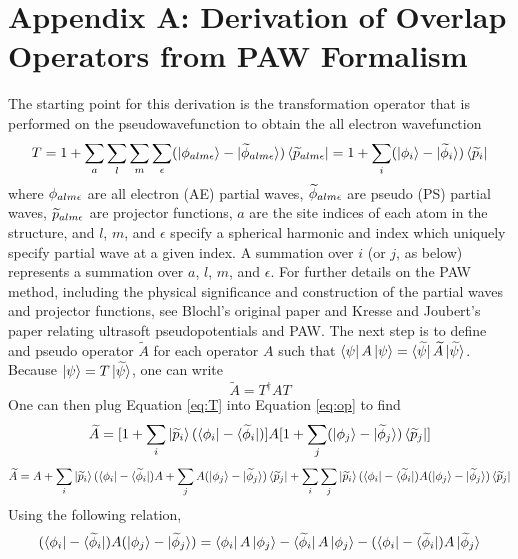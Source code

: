 \documentclass[12pt]{article}
\begin{document}
\section*{Appendix A: Derivation of Overlap Operators from PAW Formalism}
The starting point for this derivation is the transformation operator that
is performed on the pseudowavefunction to obtain the all electron wavefunction
\begin{equation}
T=1+\sum_a\sum_l\sum_m\sum_{\epsilon}(\ket{\phi_{alm\epsilon}}-\ket{\widetilde{\phi}_{alm\epsilon}})
\bra{\widetilde{p}_{alm\epsilon}}=1+\sum_i(\ket{\phi_i}-\ket{\widetilde{\phi}_i})
\bra{\widetilde{p}_i}
\label{eq:T}
\end{equation}
where $\phi_{alm\epsilon}$ are all electron (AE) partial waves, $\widetilde{\phi}_{alm\epsilon}$
are pseudo (PS) partial waves, $\widetilde{p}_{alm\epsilon}$ are projector functions,
$a$ are the site indices of each atom in the structure, and $l$, $m$, and $\epsilon$
specify a spherical harmonic and index which uniquely specify partial wave at a given
index. A summation over $i$ (or $j$, as below) represents a summation over $a$, $l$, $m$,
and $\epsilon$. For further details on the PAW method, including the physical significance
and construction of the partial waves and projector functions, see Blochl's original paper
and Kresse and Joubert's paper relating ultrasoft pseudopotentials and PAW.\cite{blochl}
The next step is to define and pseudo operator $\widetilde{A}$ for each operator $A$
such that $\bra{\psi}A\ket{\psi}=\bra{\widetilde{\psi}}\widetilde{A}\ket{\widetilde{\psi}}$.
Because $\ket{\psi}=T\ket{\widetilde{\psi}}$, one can write
\begin{equation}
\widetilde{A}=T^{\dagger}AT
\label{eq:op}
\end{equation}
One can then plug Equation \ref{eq:T} into Equation \ref{eq:op} to find
$$\widetilde{A}=[1+\sum_i\ket{\widetilde{p}_i}(\bra{\phi_i}-\bra{\widetilde{\phi}_i})]
A[1+\sum_j(\ket{\phi_j}-\ket{\widetilde{\phi}_j})
\bra{\widetilde{p}_j}]$$
\begin{equation}
\widetilde{A}=A+\sum_i\ket{\widetilde{p}_i}(\bra{\phi_i}-\bra{\widetilde{\phi}_i})A
+\sum_j A(\ket{\phi_j}-\ket{\widetilde{\phi}_j})\bra{\widetilde{p}_j}
+\sum_i\sum_j\ket{\widetilde{p}_i}(\bra{\phi_i}-\bra{\widetilde{\phi}_i})A
(\ket{\phi_j}-\ket{\widetilde{\phi}_j})\bra{\widetilde{p}_j}
\label{eq:res}
\end{equation}
Using the following relation,
$$(\bra{\phi_i}-\bra{\widetilde{\phi}_i})A(\ket{\phi_j}-\ket{\widetilde{\phi}_j})
=\bra{\phi_i}A\ket{\phi_j}-\bra{\widetilde{\phi}_i}A\ket{\phi_j}
-(\bra{\phi_i}-\bra{\widetilde{\phi}_i})A\ket{\widetilde{\phi}_j}$$
\end{document}
